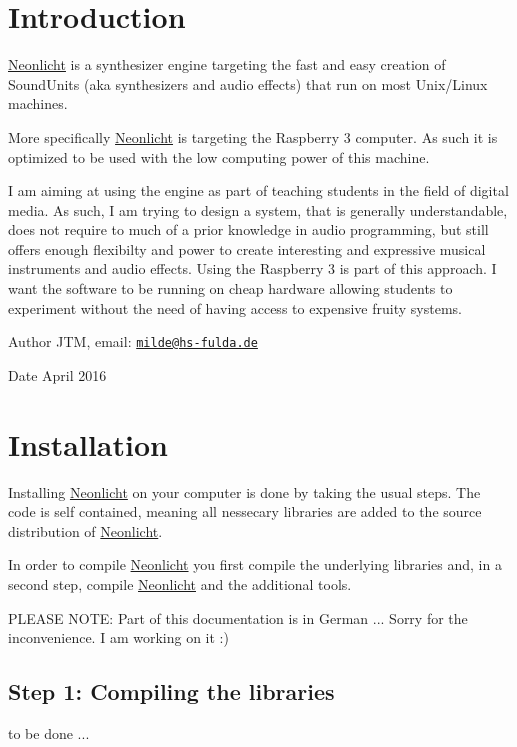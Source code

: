 \hypertarget{index_intro_sec}{}\section{Introduction}\label{index_intro_sec}
\hyperlink{classNeonlicht}{Neonlicht} is a synthesizer engine targeting the fast and easy creation of Sound\+Units (aka synthesizers and audio effects) that run on most Unix/\+Linux machines.

More specifically \hyperlink{classNeonlicht}{Neonlicht} is targeting the Raspberry 3 computer. As such it is optimized to be used with the low computing power of this machine.

I am aiming at using the engine as part of teaching students in the field of digital media. As such, I am trying to design a system, that is generally understandable, does not require to much of a prior knowledge in audio programming, but still offers enough flexibilty and power to create interesting and expressive musical instruments and audio effects. Using the Raspberry 3 is part of this approach. I want the software to be running on cheap hardware allowing students to experiment without the need of having access to expensive fruity systems.

\begin{DoxyAuthor}{Author}
J\+TM,  email\+: \href{mailto:milde@hs-fulda.de}{\tt milde@hs-\/fulda.\+de} 
\end{DoxyAuthor}
\begin{DoxyDate}{Date}
April 2016
\end{DoxyDate}
\hypertarget{index_install_sec}{}\section{Installation}\label{index_install_sec}
Installing \hyperlink{classNeonlicht}{Neonlicht} on your computer is done by taking the usual steps. The code is self contained, meaning all nessecary libraries are added to the source distribution of \hyperlink{classNeonlicht}{Neonlicht}.

In order to compile \hyperlink{classNeonlicht}{Neonlicht} you first compile the underlying libraries and, in a second step, compile \hyperlink{classNeonlicht}{Neonlicht} and the additional tools.

P\+L\+E\+A\+SE N\+O\+TE\+: Part of this documentation is in German ... Sorry for the inconvenience. I am working on it \+:)\hypertarget{index_step1}{}\subsection{Step 1\+: Compiling the libraries}\label{index_step1}
to be done ... 